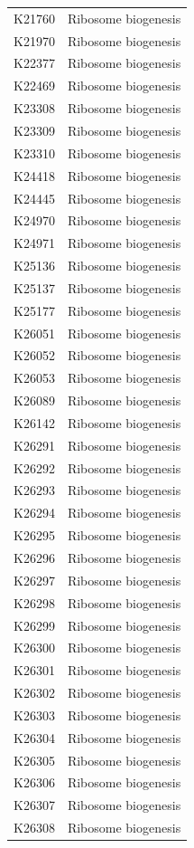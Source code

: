 \begin{longtable}{@{}l l@{}}
K21760 & Ribosome biogenesis \\
K21970 & Ribosome biogenesis \\
K22377 & Ribosome biogenesis \\
K22469 & Ribosome biogenesis \\
K23308 & Ribosome biogenesis \\
K23309 & Ribosome biogenesis \\
K23310 & Ribosome biogenesis \\
K24418 & Ribosome biogenesis \\
K24445 & Ribosome biogenesis \\
K24970 & Ribosome biogenesis \\
K24971 & Ribosome biogenesis \\
K25136 & Ribosome biogenesis \\
K25137 & Ribosome biogenesis \\
K25177 & Ribosome biogenesis \\
K26051 & Ribosome biogenesis \\
K26052 & Ribosome biogenesis \\
K26053 & Ribosome biogenesis \\
K26089 & Ribosome biogenesis \\
K26142 & Ribosome biogenesis \\
K26291 & Ribosome biogenesis \\
K26292 & Ribosome biogenesis \\
K26293 & Ribosome biogenesis \\
K26294 & Ribosome biogenesis \\
K26295 & Ribosome biogenesis \\
K26296 & Ribosome biogenesis \\
K26297 & Ribosome biogenesis \\
K26298 & Ribosome biogenesis \\
K26299 & Ribosome biogenesis \\
K26300 & Ribosome biogenesis \\
K26301 & Ribosome biogenesis \\
K26302 & Ribosome biogenesis \\
K26303 & Ribosome biogenesis \\
K26304 & Ribosome biogenesis \\
K26305 & Ribosome biogenesis \\
K26306 & Ribosome biogenesis \\
K26307 & Ribosome biogenesis \\
K26308 & Ribosome biogenesis \\

\end{longtable}
